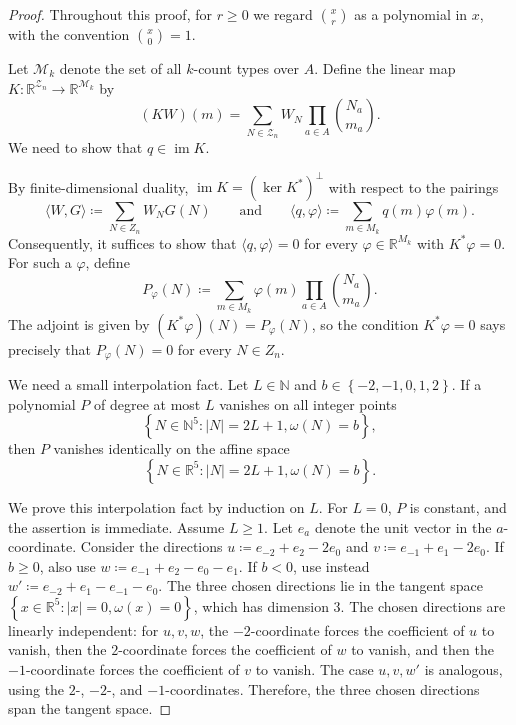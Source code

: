 \documentclass[11pt]{amsart}
\theoremstyle{plain}
\theoremstyle{definition}
\theoremstyle{remark}
\numberwithin{equation}{section}
\newcommand{\R}{\mathbb R}
\newcommand{\N}{\mathbb N}
\newcommand{\1}{\mathbf 1}
\begin{document}
\begin{proof}
Throughout this proof, for \(r\ge0\) we regard \(\binom{x}{r}\) as a polynomial in \(x\), with the convention \(\binom{x}{0}=1\).

Let \(\mathcal M_k\) denote the set of all \(k\)-count types over \(A\). Define the linear map \(K\colon\R^{\mathcal Z_n}\to\R^{\mathcal M_k}\) by
\[
\left(KW\right)\left(m\right)=\sum_{N\in\mathcal Z_n}W_N\prod_{a\in A}\binom{N_a}{m_a}.
\]
We need to show that \(q\in\operatorname{im}K\).

By finite-dimensional duality, \(\operatorname{im}K=\left(\ker K^*\right)^\perp\) with respect to the pairings
\[
\langle W,G\rangle\coloneqq\sum_{N\in Z_n}W_NG(N)
\qquad \text{and} \qquad
\langle q,\varphi\rangle\coloneqq\sum_{m\in M_k}q(m)\varphi(m).
\]
Consequently, it suffices to show that \(\langle q,\varphi\rangle=0\) for every \(\varphi\in\mathbb R^{M_k}\) with \(K^*\varphi=0\). For such a \(\varphi\), define
\[
P_\varphi(N)\coloneqq\sum_{m\in M_k}\varphi(m)\prod_{a\in A}\binom{N_a}{m_a}.
\]
The adjoint is given by \((K^*\varphi)(N)=P_\varphi(N)\), so the condition \(K^*\varphi=0\) says precisely that \(P_\varphi(N)=0\) for every \(N\in Z_n\).

We need a small interpolation fact. Let \(L\in\N\) and \(b\in\left\{-2,-1,0,1,2\right\}\). If a polynomial \(P\) of degree at most \(L\) vanishes on all integer points
\[
\left\{N\in\N^5\colon\lvert N\rvert=2L+1,\omega\left(N\right)=b\right\},
\]
then \(P\) vanishes identically on the affine space
\[
\left\{N\in\R^5\colon\lvert N\rvert=2L+1,\omega\left(N\right)=b\right\}.
\]

We prove this interpolation fact by induction on \(L\). For \(L=0\), \(P\) is constant, and the assertion is immediate. Assume \(L\ge1\). Let \(e_a\) denote the unit vector in the \(a\)-coordinate. Consider the directions \(u\coloneqq e_{-2}+e_2-2e_0\) and \(v\coloneqq e_{-1}+e_1-2e_0\). If \(b\ge0\), also use \(w\coloneqq e_{-1}+e_2-e_0-e_1\). If \(b<0\), use instead \(w'\coloneqq e_{-2}+e_1-e_{-1}-e_0\). The three chosen directions lie in the tangent space \(\left\{x\in\R^5\colon\lvert x\rvert=0,\omega\left(x\right)=0\right\}\), which has dimension \(3\). The chosen directions are linearly independent: for \(u,v,w\), the \(-2\)-coordinate forces the coefficient of \(u\) to vanish, then the \(2\)-coordinate forces the coefficient of \(w\) to vanish, and then the \(-1\)-coordinate forces the coefficient of \(v\) to vanish. The case \(u,v,w'\) is analogous, using the \(2\)-, \(-2\)-, and \(-1\)-coordinates. Therefore, the three chosen directions span the tangent space.


\end{proof}
\end{document}
